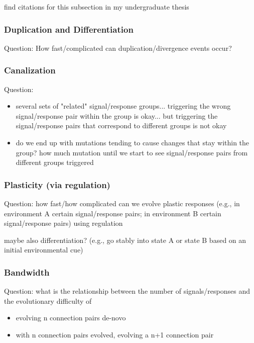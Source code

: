 find citations for this subsection in my undergraduate thesis

\subsubsection{Duplication and Differentiation}

Question: How fast/complicated can duplication/divergence events occur?

\subsubsection{Canalization}

Question:
\begin{itemize}
\item several sets of "related" signal/response groups... triggering the wrong signal/response pair within the group is okay... but triggering the signal/response pairs that correspond to different groups is not okay
\item do we end up with mutations tending to cause changes that stay within the group? how much mutation until we start to see signal/response pairs from different groups triggered
\end{itemize}

\subsubsection{Plasticity (via regulation)}

Question: how fast/how complicated can we evolve plastic responses (e.g., in environment A certain signal/response pairs; in environment B certain signal/response pairs) using regulation

maybe also differentiation?
(e.g., go stably into state A or state B based on an initial environmental cue)

\subsubsection{Bandwidth}

Question: what is the relationship between the number of signals/responses and the evolutionary difficulty of
\begin{itemize}
\item evolving n connection pairs de-novo
\item with n connection pairs evolved, evolving a n+1 connection pair
\end{itemize}

